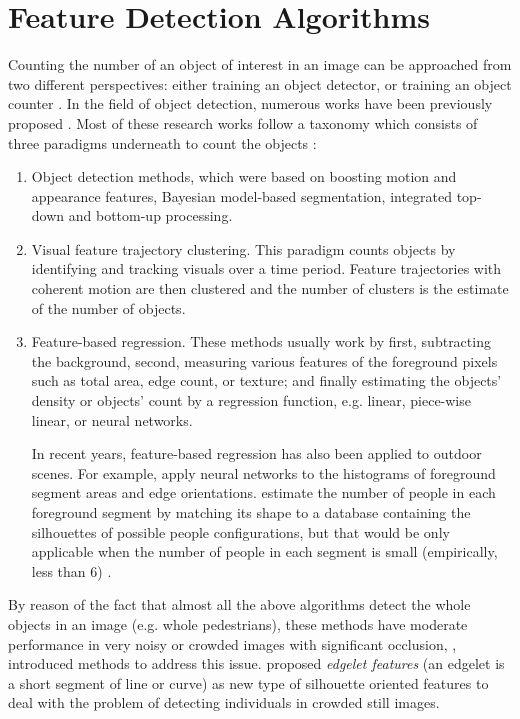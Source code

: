 \section{Feature Detection Algorithms} 
\label{fda}
Counting the number of an object of interest in an image can be approached from two different perspectives: either training an object detector, or training an object counter \cite{segui2015learning}. In the field of object detection, numerous works have been previously proposed \cite{kong2005counting, marana1998efficacy}. Most of these research works follow a taxonomy which consists of three paradigms underneath to count the objects \cite{chan2008privacy}:

\begin{enumerate}
	\item Object detection methods, which were based on boosting motion and appearance features, Bayesian model-based segmentation, integrated top-down and bottom-up processing.
	\item Visual feature trajectory clustering. This paradigm counts objects by identifying and tracking visuals over a  time period. Feature trajectories with coherent motion are then clustered and the number of clusters is the estimate of the number of objects. 

	\item Feature-based regression. These methods usually work by first, subtracting the background, second, measuring various features of the foreground pixels such as total area, edge count, or texture; and finally estimating the objects' density or objects' count by a regression function, e.g. linear, piece-wise linear, or neural networks. 

	\indent In recent years, feature-based regression has also been applied to outdoor scenes. For example, \citet{kong2005counting} apply neural networks to the histograms of foreground segment areas and edge orientations. \citet{dong2007fast} estimate the number of people in each foreground segment by matching its shape to a database containing the silhouettes of possible people configurations, but that would be only applicable when the number of people in each segment is small (empirically, less than 6) \cite{chan2008privacy}.  
\end{enumerate} 
By reason of the fact that almost all the above algorithms detect the whole objects in an image (e.g. whole pedestrians), these methods have moderate performance in very noisy or crowded images with significant occlusion, \citet{wu2005detection}, introduced methods to address this issue. \citet{wu2005detection} proposed \textit{edgelet features} (an edgelet is a short segment of line or curve) as new type of silhouette oriented features to deal with the problem of detecting individuals in crowded still images. %

